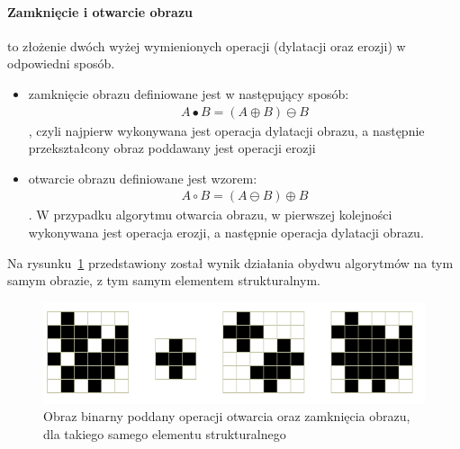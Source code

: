 \paragraph {Zamknięcie i otwarcie obrazu} to złożenie dwóch wyżej wymienionych operacji (dylatacji oraz erozji) w odpowiedni sposób.
\begin{itemize}
\item zamknięcie obrazu definiowane jest w następujący sposób:
  \begin{gather*}
    A \bullet B = (A \oplus B) \ominus B
  \end{gather*}, czyli najpierw wykonywana jest operacja dylatacji obrazu, a następnie przekształcony obraz poddawany jest operacji erozji
\item otwarcie obrazu definiowane jest wzorem:
  \begin{gather*}
    A \circ B = (A \ominus B) \oplus B
  \end{gather*}. W przypadku algorytmu otwarcia obrazu, w pierwszej kolejności wykonywana jest operacja erozji, a następnie operacja dylatacji obrazu.
\end{itemize}
Na rysunku~\ref{fig:open_close} przedstawiony został wynik działania obydwu algorytmów na tym samym obrazie, z tym samym elementem strukturalnym.
\begin{figure}
  \centering
  \includegraphics[width=15cm]{img/open-close}
  \caption{Obraz binarny poddany operacji otwarcia oraz zamknięcia obrazu, dla takiego samego elementu strukturalnego}
  \label{fig:open_close}
\end{figure}
